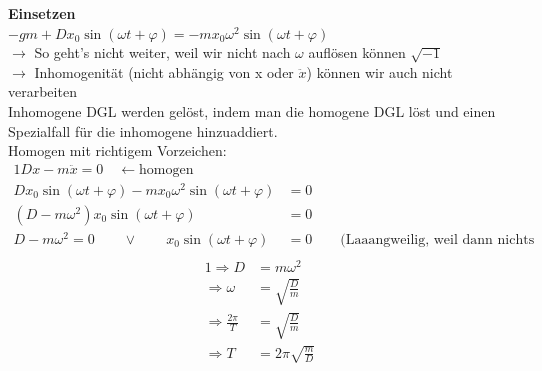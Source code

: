 \documentclass{article}
\begin{document}
	\noindent
	\textbf{Einsetzen} \\
	$-g m + D x_0 \sin (\omega t + \varphi) = -m x_0 \omega^2 \sin (\omega t + \varphi)$
	\vspace{0.2cm}\\
	$\rightarrow$ So geht's nicht weiter, weil wir nicht nach $\omega$ auflösen können $\sqrt{-1}$\\
	$\rightarrow$ Inhomogenität (nicht abhängig von x oder $\ddot{x}$) können wir auch nicht verarbeiten\\
	Inhomogene DGL werden gelöst, indem man die homogene DGL löst und einen Spezialfall für die inhomogene hinzuaddiert.\\
	Homogen mit richtigem Vorzeichen:
	\begin{alignat}{1}
		Dx - m \ddot{x} = 0 \quad \leftarrow \text{homogen}\\
		Dx_0 \sin (\omega t + \varphi) - m x_0 \omega^2 \sin (\omega t + \varphi) &= 0\\
		(D - m \omega^2) x_0 \sin (\omega t + \varphi) &= 0\\
		D - m \omega^2 = 0 \qquad \vee \qquad x_0 \sin (\omega t + \varphi) &= 0 \qquad \text{(Laaangweilig, weil dann nichts schwingt)}\\
	\end{alignat}
	\vspace{-1cm}
	\begin{alignat}{1}
		\Rightarrow D &= m \omega^2\\
		\Rightarrow \omega &= \sqrt{\frac{D}{m}}\\
		\Rightarrow \frac{2 \pi}{T} &= \sqrt{\frac{D}{m}}\\
		\Rightarrow T &= 2 \pi \sqrt{\frac{m}{D}}
	\end{alignat}
\end{document}
